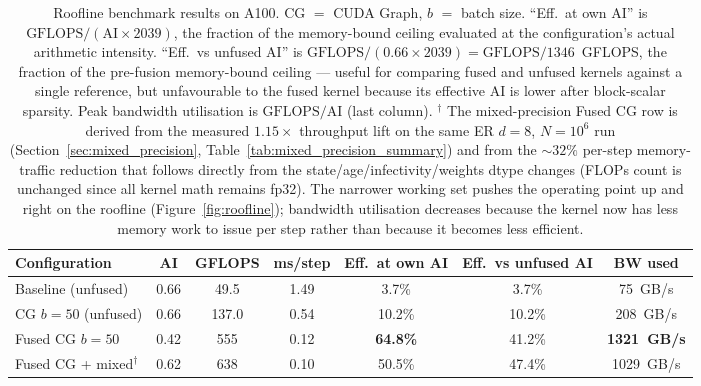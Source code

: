 \begin{table}[H]
\caption{Roofline benchmark results on A100. CG $=$ CUDA Graph, $b$ $=$ batch size. ``Eff.\ at own AI'' is $\text{GFLOPS} / (\text{AI} \times 2039)$, the fraction of the memory-bound ceiling evaluated at the configuration's actual arithmetic intensity. ``Eff.\ vs unfused AI'' is $\text{GFLOPS} / (0.66 \times 2039) = \text{GFLOPS} / 1346$~GFLOPS, the fraction of the pre-fusion memory-bound ceiling --- useful for comparing fused and unfused kernels against a single reference, but unfavourable to the fused kernel because its effective AI is lower after block-scalar sparsity. Peak bandwidth utilisation is $\text{GFLOPS}/\text{AI}$ (last column). $^\dagger$ The mixed-precision Fused CG row is derived from the measured $1.15\times$ throughput lift on the same ER $d{=}8$, $N=10^6$ run (Section~\ref{sec:mixed_precision}, Table~\ref{tab:mixed_precision_summary}) and from the $\sim\!32\%$ per-step memory-traffic reduction that follows directly from the state/age/infectivity/weights dtype changes (FLOPs count is unchanged since all kernel math remains fp32). The narrower working set pushes the operating point up and right on the roofline (Figure~\ref{fig:roofline}); bandwidth utilisation decreases because the kernel now has less memory work to issue per step rather than because it becomes less efficient.}
\label{tab:roofline}
\centering
\begin{tabular*}{\linewidth}{@{\extracolsep{\fill}}lcccccc@{}}
\toprule
\textbf{Configuration} & \textbf{AI} & \textbf{GFLOPS} & \textbf{ms/step} & \textbf{Eff.\ at own AI} & \textbf{Eff.\ vs unfused AI} & \textbf{BW used} \\
\midrule
Baseline (unfused)  & 0.66 & 49.5  & 1.49 & 3.7\%  & 3.7\%  & 75~GB/s   \\
CG $b{=}50$ (unfused) & 0.66 & 137.0 & 0.54 & 10.2\% & 10.2\% & 208~GB/s  \\
Fused CG $b{=}50$   & 0.42 & 555   & 0.12 & \textbf{64.8\%} & 41.2\% & \textbf{1321~GB/s} \\
Fused CG + mixed$^\dagger$ & 0.62 & 638 & 0.10 & 50.5\% & 47.4\% & 1029~GB/s \\
\bottomrule
\end{tabular*}
\end{table}

